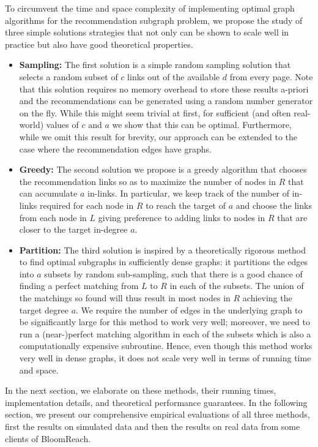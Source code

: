 To circumvent the time and space complexity of implementing optimal
graph algorithms for the recommendation subgraph problem, we propose
the study of three simple solutions strategies that not only can be
shown to scale well in practice but also have good theoretical
properties.

\begin{itemize}

\item {\bf Sampling:} The first solution is a simple random sampling
  solution that selects a random subset of $c$ links out of the
  available $d$ from every page. Note that this solution requires no
  memory overhead to store these results a-priori and the
  recommendations can be generated using a random number generator on
  the fly. While this might seem trivial at first, for sufficient (and
  often real-world) values of $c$ and $a$ we show that this can be
  optimal. Furthermore, while we omit this result for brevity, our 
  approach can be extended to the case where the recommendation edges
  have graphs.

\item {\bf Greedy:} The second solution we propose is a greedy
  algorithm that chooses the recommendation links so as to maximize
  the number of nodes in $R$ that can accumulate $a$ in-links. In
  particular, we keep track of the number of in-links required for
  each node in $R$ to reach the target of $a$ and choose the links
  from each node in $L$ giving preference to adding links to nodes in
  $R$ that are closer to the target in-degree $a$.

\item {\bf Partition:} The third solution is inspired by a
  theoretically rigorous method to find optimal subgraphs in
  sufficiently dense graphs: it partitions the edges into $a$ subsets
  by random sub-sampling, such that there is a good chance of finding
  a perfect matching from $L$ to $R$ in each of the subsets. The union
  of the matchings so found will thus result in most nodes in $R$
  achieving the target degree $a$. We require the number of edges in
  the underlying graph to be significantly large for this method to
  work very well; moreover, we need to run a (near-)perfect matching
  algorithm in each of the subsets which is also a computationally
  expensive subroutine. Hence, even though this method works very well
  in dense graphs, it does not scale very well in terms of running
  time and space.
\end{itemize}

In the next section, we elaborate on these methods, their running
times, implementation details, and theoretical performance
guarantees. In the following section, we present our comprehensive
empirical evaluations of all three methods, first the results on
simulated data and then the results on real data from some clients of
BloomReach.
